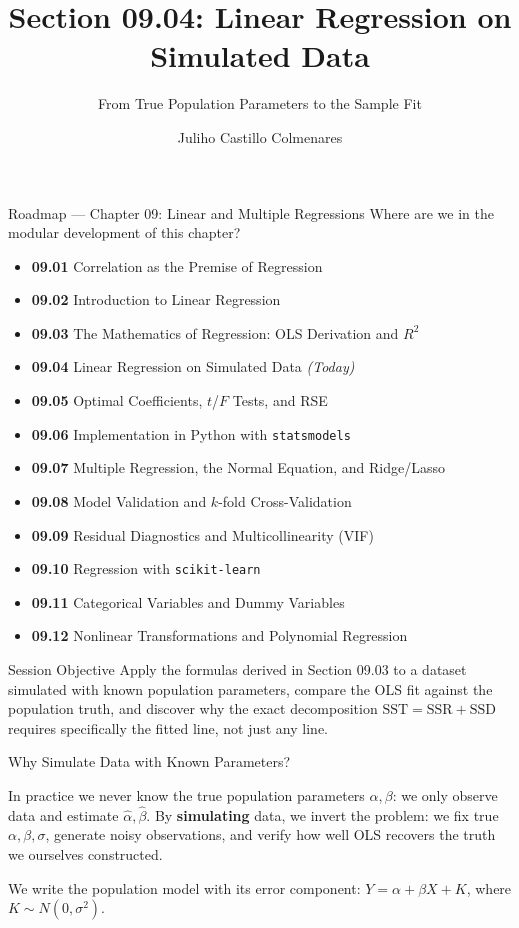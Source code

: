 \documentclass[10pt, aspectratio=169]{beamer}
\title[Regression on Simulated Data]{Section 09.04: Linear Regression on Simulated Data}
\subtitle{From True Population Parameters to the Sample Fit}
\author[J. Castillo Colmenares]{Juliho Castillo Colmenares}
\institute{Tecnológico de Monterrey}
\date{\vspace{-1.5cm}}
\begin{document}
\begin{frame}[plain]
  \titlepage
\end{frame}

\begin{frame}{Roadmap --- Chapter 09: Linear and Multiple Regressions}
  \scriptsize
  Where are we in the modular development of this chapter?
  \begin{itemize}\itemsep=0.02em
    \item \textbf{09.01} Correlation as the Premise of Regression
    \item \textbf{09.02} Introduction to Linear Regression
    \item \textbf{09.03} The Mathematics of Regression: OLS Derivation and $R^2$
    \item \textbf{09.04} Linear Regression on Simulated Data \emph{(Today)}
    \item \textbf{09.05} Optimal Coefficients, $t$/$F$ Tests, and RSE
    \item \textbf{09.06} Implementation in Python with \texttt{statsmodels}
    \item \textbf{09.07} Multiple Regression, the Normal Equation, and Ridge/Lasso
    \item \textbf{09.08} Model Validation and $k$-fold Cross-Validation
    \item \textbf{09.09} Residual Diagnostics and Multicollinearity (VIF)
    \item \textbf{09.10} Regression with \texttt{scikit-learn}
    \item \textbf{09.11} Categorical Variables and Dummy Variables
    \item \textbf{09.12} Nonlinear Transformations and Polynomial Regression
  \end{itemize}
  \pause
  \vspace{-0.05cm}
  \begin{block}{Session Objective}
    Apply the formulas derived in Section 09.03 to a dataset simulated with known population parameters, compare the OLS fit against the population truth, and discover why the exact decomposition $\text{SST}=\text{SSR}+\text{SSD}$ requires specifically the fitted line, not just any line.
  \end{block}
\end{frame}

\begin{frame}{Why Simulate Data with Known Parameters?}
  \footnotesize
  \begin{motivacion}
    In practice we never know the true population parameters $\alpha,\beta$: we only observe data and estimate $\hat\alpha,\hat\beta$. By \textbf{simulating} data, we invert the problem: we fix true $\alpha,\beta,\sigma$, generate noisy observations, and verify how well OLS recovers the truth we ourselves constructed.
  \end{motivacion}

  \vspace{0.15cm}
  \pause
  We write the population model with its error component: $Y=\alpha+\beta X+K$, where $K\sim N(0,\sigma^2)$.
\end{frame}
\end{document}

